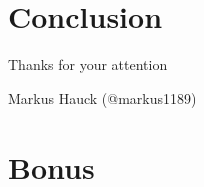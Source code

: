 \documentclass{beamer}
\begin{document}
\section{Conclusion}\label{sec:conclusion}

\begin{frame}
  \begin{center}
    \Huge
    Thanks for your attention
  \end{center}
  \begin{center}
    \Huge
    Markus Hauck (@markus1189)
  \end{center}
\end{frame}

\begin{frame}
  \tableofcontents{}
\end{frame}

\appendix{}

\section*{Bonus}\label{sec:bonus}
\end{document}
